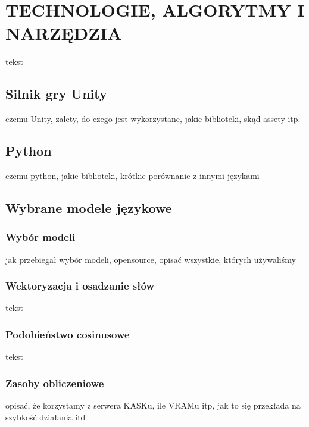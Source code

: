 \chapter{TECHNOLOGIE, ALGORYTMY I NARZĘDZIA}

tekst

\section{Silnik gry Unity}

czemu Unity, zalety, do czego jest wykorzystane, jakie biblioteki, skąd assety itp.

\section{Python}

czemu python, jakie biblioteki, krótkie porównanie z innymi językami

\section{Wybrane modele językowe}

\subsection{Wybór modeli}

jak przebiegał wybór modeli, opensource, opisać wszystkie, których używaliśmy

\subsection{Wektoryzacja i osadzanie słów}

tekst

\subsection{Podobieństwo cosinusowe}

tekst

\subsection{Zasoby obliczeniowe}

opisać, że korzystamy z serwera KASKu, ile VRAMu itp, jak to się przekłada na szybkość działania itd